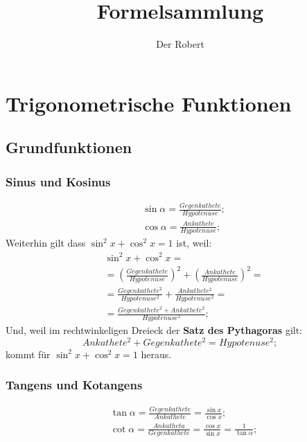 \documentclass[a4paper]{article}
\begin{document}
\setlength{\parindent}{0mm}

\title{Formelsammlung}
\author{Der Robert}
\maketitle

\tableofcontents
\newpage

\section{Trigonometrische Funktionen}

\subsection{Grundfunktionen}

\subsubsection{Sinus und Kosinus}
\begin{align*}
	&\sin{\alpha} = \frac{Gegenkathete}{Hypotenuse} ;
	\\
	&\cos{\alpha} = \frac{Ankathete}{Hypotenuse} ;
\end{align*}
Weiterhin gilt dass $ \sin^2{x} + \cos^2{x} = 1 $ ist, weil:
\begin{align*}
	& \sin^2{x} + \cos^2{x} = \\
	& = \left( \frac{Gegenkathete}{Hypotenuse} \right) ^2 + \left( \frac{Ankathete}{Hypotenuse} \right) ^ 2 = \\
	& = \frac{Gegenkathete^2}{Hypotenuse^2} + \frac{Ankathete^2}{Hypotenuse^2} = \\
	& = \frac{Gegenkathete^2 + Ankathete^2}{Hypotenuse^2} ;
\end{align*}
Und, weil im rechtwinkeligen Dreieck der \textbf{Satz des Pythagoras} gilt:
\[
	Ankathete^2 + Gegenkathete^2 = Hypotenuse^2 ;
\]
kommt für $ \sin^2{x} + \cos^2{x} = 1 $ heraus.

\subsubsection{Tangens und Kotangens}
\begin{align*}
	&\tan{\alpha} = \frac{Gegenkathete}{Ankathete} = \frac{\sin{x}}{\cos{x}} ;
	\\
	&\cot{\alpha} = \frac{Ankatheta}{Gegenkathete} = \frac{\cos{x}}{\sin{x}} = \frac{1}{\tan{\alpha}} ;
\end{align*}
\end{document}
